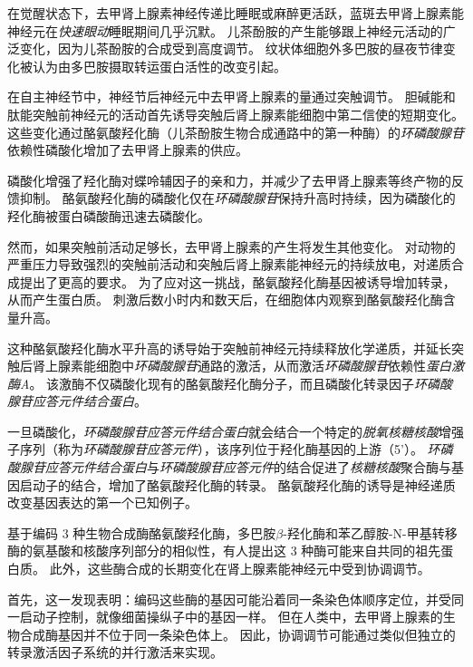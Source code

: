 \begin{proposition}[儿茶酚胺的产生随神经元活动而变化] \label{box:16_1}
	
	\quad \quad 在觉醒状态下，去甲肾上腺素神经传递比睡眠或麻醉更活跃，蓝斑去甲肾上腺素能神经元在\textit{快速眼动}睡眠期间几乎沉默。
	儿茶酚胺的产生能够跟上神经元活动的广泛变化，因为儿茶酚胺的合成受到高度调节。
	纹状体细胞外多巴胺的昼夜节律变化被认为由多巴胺摄取转运蛋白活性的改变引起。
	
	\quad \quad 在自主神经节中，神经节后神经元中去甲肾上腺素的量通过突触调节。
	胆碱能和肽能突触前神经元的活动首先诱导突触后肾上腺素能细胞中第二信使的短期变化。
	这些变化通过酪氨酸羟化酶（儿茶酚胺生物合成通路中的第一种酶）的\textit{环磷酸腺苷}依赖性磷酸化增加了去甲肾上腺素的供应。
	
	\quad \quad 磷酸化增强了羟化酶对蝶呤辅因子的亲和力，并减少了去甲肾上腺素等终产物的反馈抑制。
	酪氨酸羟化酶的磷酸化仅在\textit{环磷酸腺苷}保持升高时持续，因为磷酸化的羟化酶被蛋白磷酸酶迅速去磷酸化。
	
	\quad \quad 然而，如果突触前活动足够长，去甲肾上腺素的产生将发生其他变化。
	对动物的严重压力导致强烈的突触前活动和突触后肾上腺素能神经元的持续放电，对递质合成提出了更高的要求。
	为了应对这一挑战，酪氨酸羟化酶基因被诱导增加转录，从而产生蛋白质。
	刺激后数小时内和数天后，在细胞体内观察到酪氨酸羟化酶含量升高。
	
	\quad \quad 这种酪氨酸羟化酶水平升高的诱导始于突触前神经元持续释放化学递质，并延长突触后肾上腺素能细胞中\textit{环磷酸腺苷}通路的激活，从而激活\textit{环磷酸腺苷}依赖性\textit{蛋白激酶A}。
	该激酶不仅磷酸化现有的酪氨酸羟化酶分子，而且磷酸化转录因子\textit{环磷酸腺苷应答元件结合蛋白}。
	
	\quad \quad 一旦磷酸化，\textit{环磷酸腺苷应答元件结合蛋白}就会结合一个特定的\textit{脱氧核糖核酸}增强子序列（称为\textit{环磷酸腺苷应答元件}），该序列位于羟化酶基因的上游（5'）。
	\textit{环磷酸腺苷应答元件结合蛋白}与\textit{环磷酸腺苷应答元件}的结合促进了\textit{核糖核酸}聚合酶与基因启动子的结合，增加了酪氨酸羟化酶的转录。
	酪氨酸羟化酶的诱导是神经递质改变基因表达的第一个已知例子。
	
	\quad \quad 基于编码 3 种生物合成酶酪氨酸羟化酶，多巴胺$\beta$-羟化酶和苯乙醇胺-N-甲基转移酶的氨基酸和核酸序列部分的相似性，有人提出这 3 种酶可能来自共同的祖先蛋白质。
	此外，这些酶合成的长期变化在肾上腺素能神经元中受到协调调节。
	
	\quad \quad 首先，这一发现表明：编码这些酶的基因可能沿着同一条染色体顺序定位，并受同一启动子控制，就像细菌操纵子中的基因一样。
	但在人类中，去甲肾上腺素的生物合成酶基因并不位于同一条染色体上。
	因此，协调调节可能通过类似但独立的转录激活因子系统的并行激活来实现。
	
\end{proposition}



